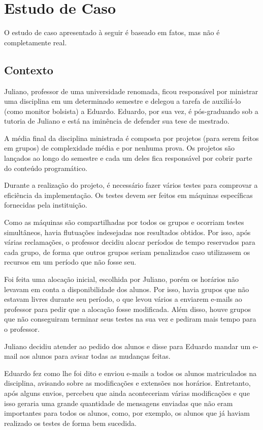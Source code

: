 \documentclass[a4paper,dvipdfm]{article}
\begin{document}
\section{Estudo de Caso}
	O estudo de caso apresentado à seguir é baseado em fatos, mas não é completamente real. 

	\subsection{Contexto}	
    Juliano, professor de uma universidade renomada, ficou responsável por ministrar uma disciplina em um determinado semestre e delegou a tarefa de auxiliá-lo (como monitor bolsista) a Eduardo. 
	Eduardo, por sua vez, é pós-graduando sob a tutoria de Juliano e está na iminência de defender sua tese de mestrado.

    A média final da disciplina ministrada é composta por projetos (para serem feitos em grupos) de complexidade média e por nenhuma prova.
	Os projetos são lançados ao longo do semestre e cada um deles fica responsável por cobrir parte do conteúdo programático.

	Durante a realização do projeto, é necessário fazer vários testes para comprovar a eficiência da implementação. 
	Os testes devem ser feitos em máquinas específicas fornecidas pela instituição.
	
	Como as máquinas são compartilhadas por todos os grupos e ocorriam testes simultâneos, havia flutuações indesejadas nos resultados obtidos.
	Por isso, após várias reclamações, o professor decidiu alocar períodos de tempo reservados para cada grupo, de forma que outros grupos seriam penalizados caso utilizassem os recursos em um período que não fosse seu.

	Foi feita uma alocação inicial, escolhida por Juliano, porém os horários não levavam em conta a disponibilidade dos alunos. 
	Por isso, havia grupos que não estavam livres durante seu período, o que levou vários a enviarem e-mails ao professor para pedir que a alocação fosse modificada.
	Além disso, houve grupos que não conseguiram terminar seus testes na sua vez e pediram mais tempo para o professor.

	Juliano decidiu atender ao pedido dos alunos e disse para Eduardo mandar um e-mail aos alunos para avisar todas as mudanças feitas.
	
	Eduardo fez como lhe foi dito e enviou e-mails a todos os alunos matriculados na disciplina, avisando sobre as modificações e extensões nos horários.
	Entretanto, após alguns envios, percebeu que ainda aconteceriam várias modificações e que isso geraria uma grande quantidade de mensagens enviadas que não eram importantes para todos os alunos, como, por exemplo, os alunos que já haviam realizado os testes de forma bem sucedida.
\end{document}
